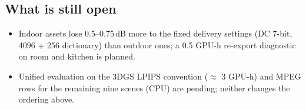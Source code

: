 \documentclass[11pt,a4paper]{article}
\begin{document}
\subsection{What is still open}
\begin{itemize}[nosep,leftmargin=*]
  \item Indoor assets lose 0.5--0.75\,dB more to the fixed delivery settings (DC 7-bit, 4096 + 256 dictionary) than outdoor ones; a 0.5 GPU-h re-export diagnostic on room and kitchen is planned.
  \item Unified evaluation on the 3DGS LPIPS convention ($\approx$ 3 GPU-h) and MPEG rows for the remaining nine scenes (CPU) are pending; neither changes the ordering above.
\end{itemize}
\end{document}
